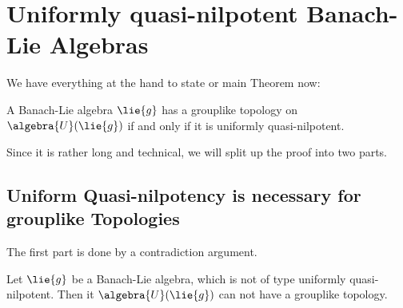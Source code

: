 \documentclass[
11pt,                          %
english                        %
]{article}
\begin{document}
\section{Uniformly quasi-nilpotent Banach-Lie Algebras}

We have everything at the hand to state or main Theorem now:
\begin{theorem}
	\label{Thm:Main}
	A Banach-Lie algebra $\lie{g}$ has a grouplike topology on 
	$\algebra{U}(\lie{g})$ if and only if it is uniformly quasi-nilpotent.
\end{theorem}
Since it is rather long and technical, we will split up the proof into two parts.


\subsection{Uniform Quasi-nilpotency is necessary for grouplike Topologies}
The first part is done by a contradiction argument.
\begin{proposition}
	\label{prop:mainthm_part_1}
	Let $\lie{g}$ be a Banach-Lie algebra, which is not of type uniformly 
	quasi-nilpotent. Then it $\algebra{U}(\lie{g})$ can not have a grouplike 
	topology.
\end{proposition}
\end{document}
